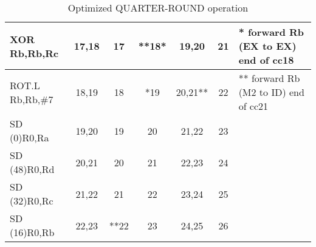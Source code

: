 \begin{enumerate}[wide, label=(B\arabic*)]
\begin{table}[htp]
{\begin{tabular}{|l|c|c|c|c|c|l|}
		XOR Rb,Rb,Rc       & 17,18 & 17	& **18*    & 19,20   & 21 & * forward Rb (EX to EX) end of cc18  \\ \hline
		ROT.L Rb,Rb,\#7    & 18,19 & 18	& *19      & 20,21** & 22 & ** forward Rb (M2 to ID) end of cc21 \\ \hline
		SD (0)R0,Ra        & 19,20 & 19	& 20       & 21,22   & 23 &                                      \\ \hline
		SD (48)R0,Rd       & 20,21 & 20	& 21       & 22,23   & 24 &                                      \\ \hline
		SD (32)R0,Rc       & 21,22 & 21	& 22       & 23,24   & 25 &                                      \\ \hline
		SD (16)R0,Rb       & 22,23 & **22	& 23       & 24,25   & 26 &                                      \\ \hline
		\end{tabular}
	}
\caption{Optimized QUARTER-ROUND operation}\label{tab:B4}
\end{table}


\end{enumerate}
